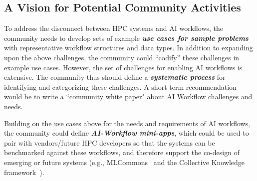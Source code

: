 \subsection{A Vision for Potential Community Activities}

To address the disconnect between HPC systems and AI workflows, the community needs to develop sets of example \textbf{\emph{use cases for sample problems}} with representative workflow structures and data types. In addition to expanding upon the above challenges, the community could ``codify'' these challenges in example use cases. However, the set of challenges for enabling AI workflows is extensive. The community thus should define a \textbf{\emph{systematic process}} for identifying and categorizing these challenges. A short-term recommendation would be to write a ``community white paper" about AI Workflow challenges and needs.

Building on the use cases above for the needs and requirements of AI workflows, the community could define \textbf{\emph{AI-Workflow mini-apps}}, which could be used to pair with vendors/future HPC developers so that the systems can be benchmarked against these workflows, and therefore support the co-design of emerging or future systems (e.g., MLCommons~\cite{mlcommons} and the Collective Knowledge framework~\cite{fursin2020collective}).
